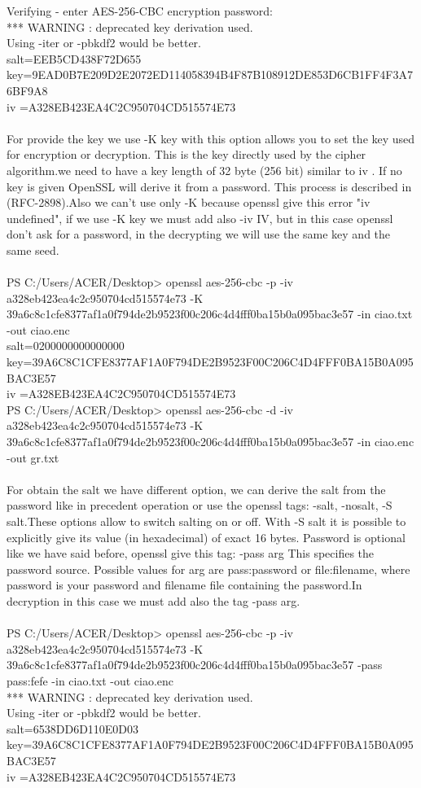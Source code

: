 \documentclass{article}
\begin{document}
Verifying - enter AES-256-CBC encryption password:\\
*** WARNING : deprecated key derivation used.\\
Using -iter or -pbkdf2 would be better.\\
salt=EEB5CD438F72D655\\
key=9EAD0B7E209D2E2072ED114058394B4F87B108912DE853D6CB1FF4F3A76BF9A8\\
iv =A328EB423EA4C2C950704CD515574E73\\
\\
For provide the key we use -K key with this option allows you to set the key used for encryption or decryption. This is the key directly used by the cipher algorithm.we need to have a key length of 32 byte (256 bit) similar to iv . If no key is given OpenSSL will derive it from a password. This process is described in (RFC-2898).Also we can't use only -K because openssl give this error "iv undefined", if we use -K key we must add also -iv IV, but in this case openssl don't ask for a password, in the decrypting we will use the same key and the same seed.\\\\
PS C:/Users/ACER/Desktop> openssl aes-256-cbc -p -iv a328eb423ea4c2c950704cd515574e73 -K 39a6c8c1cfe8377af1a0f794de2b9523f00c206c4d4fff0ba15b0a095bac3e57 -in ciao.txt -out ciao.enc\\
salt=0200000000000000\\
key=39A6C8C1CFE8377AF1A0F794DE2B9523F00C206C4D4FFF0BA15B0A095BAC3E57\\
iv =A328EB423EA4C2C950704CD515574E73\\
PS C:/Users/ACER/Desktop> openssl aes-256-cbc -d -iv a328eb423ea4c2c950704cd515574e73 -K 39a6c8c1cfe8377af1a0f794de2b9523f00c206c4d4fff0ba15b0a095bac3e57 -in ciao.enc -out gr.txt\\
\\
For obtain the salt we have different option, we can derive the salt from the password like in precedent operation or use the openssl tags: -salt, -nosalt, -S salt.These options allow to switch salting on or off. With -S salt it is possible to explicitly give its value (in hexadecimal) of exact 16 bytes. Password is optional like we have said before, openssl give this tag: -pass arg
This specifies the password source. Possible values for arg are pass:password or file:filename, where password is your password and filename file containing the password.In decryption in this case we must add also the tag -pass arg.\\\\
PS C:/Users/ACER/Desktop> openssl aes-256-cbc -p -iv a328eb423ea4c2c950704cd515574e73 -K 39a6c8c1cfe8377af1a0f794de2b9523f00c206c4d4fff0ba15b0a095bac3e57 -pass pass:fefe -in ciao.txt -out ciao.enc\\
*** WARNING : deprecated key derivation used.\\
Using -iter or -pbkdf2 would be better.\\
salt=6538DD6D110E0D03\\
key=39A6C8C1CFE8377AF1A0F794DE2B9523F00C206C4D4FFF0BA15B0A095BAC3E57\\
iv =A328EB423EA4C2C950704CD515574E73\\
\end{document}
